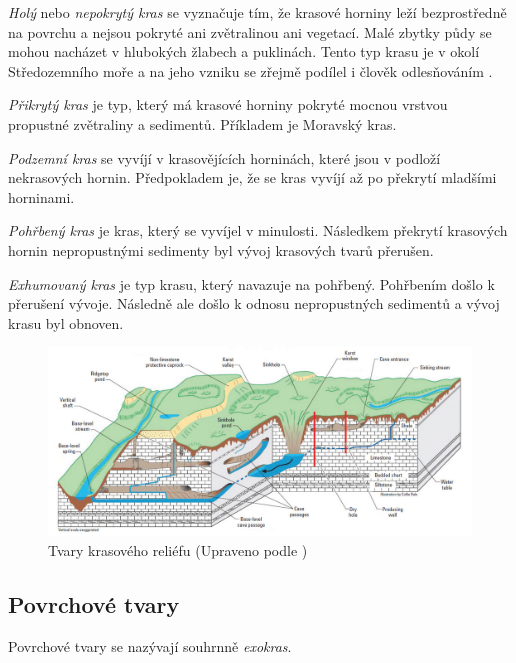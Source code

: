 \emph{Holý} nebo \emph{nepokrytý kras} se vyznačuje tím, že krasové horniny leží bezprostředně na povrchu a nejsou pokryté ani zvětralinou ani vegetací. Malé zbytky půdy se mohou nacházet v hlubokých žlabech a puklinách. Tento typ krasu je v okolí Středozemního moře a na jeho vzniku se zřejmě podílel i člověk odlesňováním \parencite{demekObecnaGeomorfologie1987}. 

\emph{Přikrytý kras} je typ, který má krasové horniny pokryté mocnou vrstvou propustné zvětraliny a sedimentů. Příkladem je Moravský kras.

\emph{Podzemní kras} se vyvíjí v krasovějících horninách, které jsou v podloží nekrasových hornin. Předpokladem je, že se kras vyvíjí až po překrytí mladšími horninami.

\emph{Pohřbený kras} je kras, který se vyvíjel v minulosti. Následkem překrytí krasových hornin nepropustnými sedimenty byl vývoj krasových tvarů přerušen.

\emph{Exhumovaný kras} je typ krasu, který navazuje na pohřbený. Pohřbením došlo k přerušení vývoje. Následně ale došlo k odnosu nepropustných sedimentů a vývoj krasu byl obnoven.

\begin{figure}[h]
	\centering
	\includegraphics[width=\linewidth]{obrazky/karst/KarstterrainUSGS}
	\caption{Tvary krasového reliéfu (Upraveno podle \textcite{currensGeneralizedBlockDiagram2001})}
	\label{fig:karstterrainusgs}
\end{figure}

\subsection{Povrchové tvary}
Povrchové tvary se nazývají souhrnně \emph{exokras}. 


